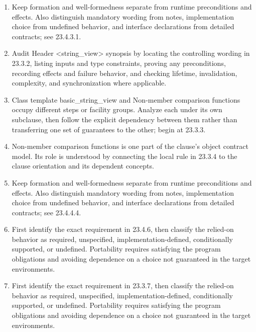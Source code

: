\documentclass[11pt,letterpaper]{article}
\begin{document}
\begin{enumerate}
\item Keep formation and well-formedness separate from runtime preconditions and effects. Also distinguish mandatory wording from notes, implementation choice from undefined behavior, and interface declarations from detailed contracts; see 23.4.3.1.
\item Audit Header <string\_\allowbreak{}view> synopsis by locating the controlling wording in 23.3.2, listing inputs and type constraints, proving any preconditions, recording effects and failure behavior, and checking lifetime, invalidation, complexity, and synchronization where applicable.
\item Class template basic\_\allowbreak{}string\_\allowbreak{}view and Non-member comparison functions occupy different steps or facility groups. Analyze each under its own subclause, then follow the explicit dependency between them rather than transferring one set of guarantees to the other; begin at 23.3.3.
\item Non-member comparison functions is one part of the clause's object contract model. Its role is understood by connecting the local rule in 23.3.4 to the clause orientation and its dependent concepts.
\item Keep formation and well-formedness separate from runtime preconditions and effects. Also distinguish mandatory wording from notes, implementation choice from undefined behavior, and interface declarations from detailed contracts; see 23.4.4.4.
\item First identify the exact requirement in 23.4.6, then classify the relied-on behavior as required, unspecified, implementation-defined, conditionally supported, or undefined. Portability requires satisfying the program obligations and avoiding dependence on a choice not guaranteed in the target environments.
\item First identify the exact requirement in 23.3.7, then classify the relied-on behavior as required, unspecified, implementation-defined, conditionally supported, or undefined. Portability requires satisfying the program obligations and avoiding dependence on a choice not guaranteed in the target environments.
\end{enumerate}
\end{document}
